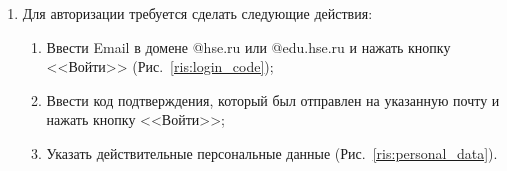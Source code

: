 \documentclass{../includes/TechDoc}
\begin{document}
\begin{enumerate}
        \newpage
        \item Для авторизации требуется сделать следующие действия:
        \begin{enumerate}
            \item Ввести Email в домене @hse.ru или @edu.hse.ru и нажать кнопку <<Войти>> (Рис.~\ref{ris:login_code});
            \item Ввести код подтверждения, который был отправлен на указанную почту и нажать кнопку <<Войти>>;
            \item Указать действительные персональные данные (Рис.~\ref{ris:personal_data}).
        \end{enumerate}
        \begin{figure}[h]
            \begin{center}
                \begin{minipage}[h]{0.4\linewidth}

\end{minipage}
\end{center}
\end{figure}
\end{enumerate}
\end{document}
